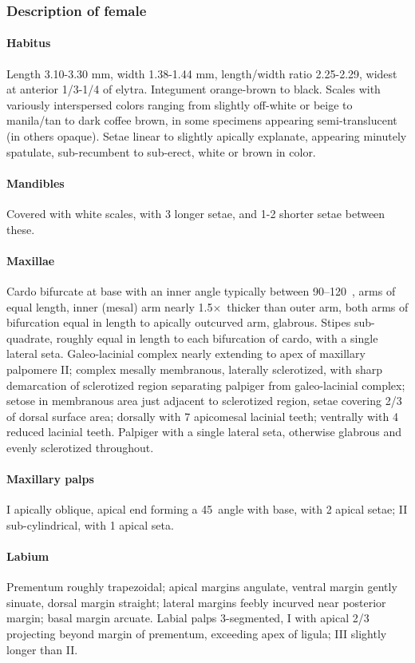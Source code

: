\documentclass[fleqn,10pt,lineno]{wlpeerj} %
\newcommand{\td}{\textdegree~}
\newcommand{\x}{$\times$~}
\begin{document}
		\subsubsection*{Description of female}
			\paragraph{Habitus}
				Length 3.10-3.30 mm, width 1.38-1.44 mm, length/width ratio 2.25-2.29, widest at anterior 1/3-1/4 of elytra.
				Integument orange-brown to black. 
				Scales with variously interspersed colors ranging from slightly off-white or beige to manila/tan to dark coffee brown, in some specimens appearing semi-translucent (in others opaque). 
				Setae linear to slightly apically explanate, appearing minutely spatulate, sub-recumbent to sub-erect, white or brown in color.
			\paragraph{Mandibles}
				Covered with white scales, with 3 longer setae, and 1-2 shorter setae between these.
			\paragraph{Maxillae}
				Cardo bifurcate at base with an inner angle typically between 90–120\td, arms of equal length, inner (mesal) arm nearly 1.5\x thicker than outer arm, both arms of bifurcation equal in length to apically outcurved arm, glabrous. 
				Stipes sub-quadrate, roughly equal in length to each bifurcation of cardo, with a single lateral seta. 
				Galeo-lacinial complex nearly extending to apex of maxillary palpomere II; complex mesally membranous, laterally sclerotized, with sharp demarcation of sclerotized region separating palpiger from galeo-lacinial complex; setose in membranous area just adjacent to sclerotized
region, setae covering 2/3 of dorsal surface area; dorsally with 7 apicomesal lacinial teeth; ventrally with 4 reduced lacinial teeth. 
				Palpiger with a single lateral seta, otherwise glabrous and evenly sclerotized throughout.
			\paragraph{Maxillary palps}
				I apically oblique, apical end forming a 45\td angle with base, with 2 apical setae; II sub-cylindrical, with 1 apical seta.
			\paragraph{Labium}
				Prementum roughly trapezoidal; apical margins angulate, ventral margin gently sinuate, dorsal margin straight; lateral margins feebly incurved near posterior margin; basal margin arcuate.
				Labial palps 3-segmented, I with apical 2/3 projecting beyond margin of prementum, exceeding apex of ligula; III slightly longer than II.
\end{document}
